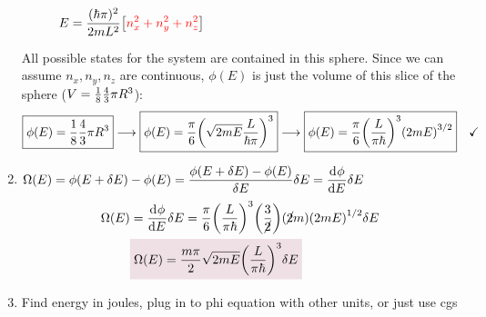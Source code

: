 \documentclass{article}
\begin{document}
\begin{problem}
\begin{enumerate}[label=\alph*)]
\begin{figure}[H]
                \caption*{$\displaystyle E=\frac{(\hbar \pi)^2}{2mL^2}\qty[\textcolor{Red1}{ n_x^2+ n_y^2+ n_z^2}]$}
            \end{figure} 
            All possible states for the system are contained in this sphere. Since we can assume $n_x,n_y,n_z$ are continuous, $\phi(E)$ is just the volume of this slice of the sphere ($V=\oo{8}\frac{4}{3}\pi R^3$): 
            \begin{equation*}
                \boxed{\phi(E)=\oo{8}\frac{4}{3}\pi R^3}\longrightarrow
                \boxed{\phi(E)=\oo[\pi]{6}\qty(\sqrt{2mE}\frac{L}{\hbar\pi})^3}
                \longrightarrow
                \boxed{\phi(E)=\frac{\pi}{6}\qty(\frac{L}{\pi\hbar})^3\qty(2mE)^{3/2}}\quad\checkmark
            \end{equation*}
            \item $\displaystyle \Omega(E)=\phi(E+\delta E)-\phi(E)=\frac{\phi(E+\delta E)-\phi(E)}{\delta E}\delta E= \der{\phi}{E}\delta E$
            \begin{align*}
                \Omega(E)&=\der{\phi}{E}\delta E=\frac{\pi}{6}\qty(\frac{L}{\pi\hbar})^3\qty(\frac{3}{\cancel{2}})(\cancel{2}m)\qty(2mE)^{1/2}\delta E
                \\
                &\coloredanswer{\Omega(E)=\frac{m\pi}{2}\sqrt{2mE}\qty(\frac{L}{\pi\hbar})^3\delta E}
            \end{align*}
            \item \textcolor{Red1}{Find energy in joules, plug in to phi equation with other units, or just use cgs}
        \end{enumerate}
    \end{problem}\newpage
\end{document}

